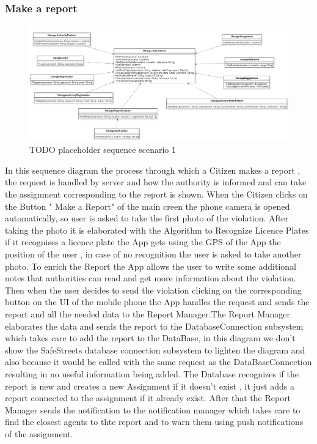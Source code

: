\subsubsection{Make a report}
\begin{figure}[H]
\centering
\includegraphics[width=\textwidth]{Images/Interfaces.png}
\caption{\label{fig:ComWI}TODO placeholder sequence scenario 1}
\end{figure}
In this sequence diagram the process through which a Citizen makes a report , the request is handled by server and how the authority is informed and can take the assignment corresponding to the report is shown.
When the Citizen clicks on the Button " Make a Report" of the main creen the phone camera is opened automatically, so user is asked to take the first photo of the violation. After taking the photo it is elaborated with the Algorithm to Recognize Licence Plates if it recognises a licence plate the App gets using the GPS of the App the position of the user , in case of no recognition the user is asked to take another photo. To enrich the Report the App allows the user to write some additional notes that authorities can read and get more information about the violation. Then when the user decides to send the violation clicking on the corresponding button on the UI of the mobile phone the App handles the request and sends the report and all the needed data to the Report Manager.The Report Manager elaborates the data and sends the report to the DatabaseConnection subsystem which takes care to add the report to the DataBase, in this diagram we don't show the SafeStreets database connection subsystem to lighten the diagram and also because it would be called with the same request as the DataBaseConnection resulting in no useful information being added. The Database recognizes if the report is new and creates a new Assignment if it doesn't exist , it just adds a report connected to the assignment if it already exist. After that the Report Manager sends the notification to the notification manager which takes care to find the closest agents to thte report and to warn them using push notifications of the assignment.
